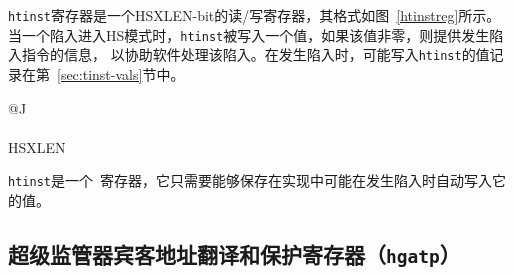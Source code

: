 {\tt htinst}寄存器是一个HSXLEN-bit的读/写寄存器，其格式如图~\ref{htinstreg}所示。
当一个陷入进入HS模式时，{\tt htinst}被写入一个值，如果该值非零，则提供发生陷入指令的信息，
以协助软件处理该陷入。在发生陷入时，可能写入{\tt htinst}的值记录在第~\ref{sec:tinst-vals}节中。

\begin{figure*}[h!]
{\footnotesize
\begin{center}
\begin{tabular}{@{}J}
 \\
\hline
{} \\
\hline
HSXLEN \\
\end{tabular}
\end{center}
}
\vspace{-0.1in}
\caption{超级监管器陷入指令寄存器（{\tt htinst}）。
 }
\label{htinstreg}
\end{figure*}

{\tt htinst}是一个\warl\ 寄存器，它只需要能够保存在实现中可能在发生陷入时自动写入它的值。

\subsection{超级监管器宾客地址翻译和保护寄存器（{\tt hgatp}）
  }
\label{sec:hgatp}

